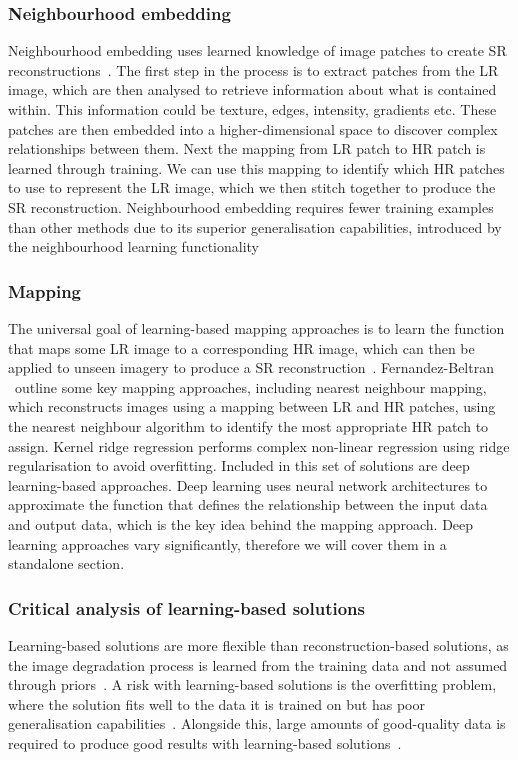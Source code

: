 \subsubsection{Neighbourhood embedding}
Neighbourhood embedding uses learned knowledge of image patches to create SR reconstructions~\cite{neighbourhoodEmbedding}. The first step in the process is to extract patches from the LR image, which are then analysed to retrieve information about what is contained within. This information could be texture, edges, intensity, gradients etc. These patches are then embedded into a higher-dimensional space to discover complex relationships between them. Next the mapping from LR patch to HR patch is learned through training. We can use this mapping to identify which HR patches to use to represent the LR image, which we then stitch together to produce the SR reconstruction. Neighbourhood embedding requires fewer training examples than other methods due to its superior generalisation capabilities, introduced by the neighbourhood learning functionality~\cite{neighbourhoodEmbedding}

\subsubsection{Mapping}
The universal goal of learning-based mapping approaches is to learn the function that maps some LR image to a corresponding HR image, which can then be applied to unseen imagery to produce a SR reconstruction~\cite{superResRemoteSensingOverview}. Fernandez-Beltran \etal\ outline some key mapping approaches, including nearest neighbour mapping, which reconstructs images using a mapping between LR and HR patches, using the nearest neighbour algorithm to identify the most appropriate HR patch to assign. Kernel ridge regression performs complex non-linear regression using ridge regularisation to avoid overfitting. Included in this set of solutions are deep learning-based approaches. Deep learning uses neural network architectures to approximate the function that defines the relationship between the input data and output data, which is the key idea behind the mapping approach. Deep learning approaches vary significantly, therefore we will cover them in a standalone section.

\subsubsection{Critical analysis of learning-based solutions}
Learning-based solutions are more flexible than reconstruction-based solutions, as the image degradation process is learned from the training data and not assumed through priors~\cite{neighbourhoodEmbedding}. A risk with learning-based solutions is the overfitting problem, where the solution fits well to the data it is trained on but has poor generalisation capabilities~\cite{overfitting}. Alongside this, large amounts of good-quality data is required to produce good results with learning-based solutions~\cite{superResRemoteSensingOverview}.

